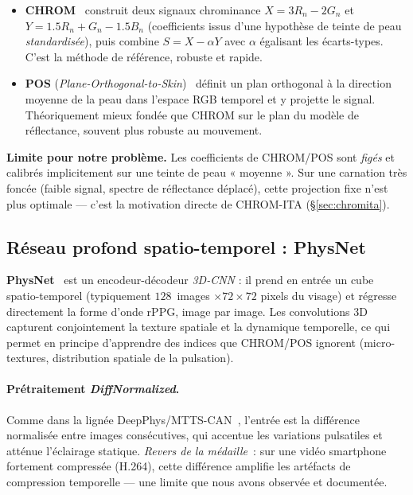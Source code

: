 \documentclass[11pt,a4paper]{article}
\begin{document}
\begin{itemize}[leftmargin=1.4em]
\item \textbf{CHROM}~\cite{dehaan2013} construit deux signaux chrominance
$X = 3R_n - 2G_n$ et $Y = 1.5R_n + G_n - 1.5B_n$ (coefficients issus d'une
hypothèse de teinte de peau \emph{standardisée}), puis combine
$S = X - \alpha Y$ avec $\alpha$ égalisant les écarts-types. C'est la méthode de
référence, robuste et rapide.
\item \textbf{POS} (\emph{Plane-Orthogonal-to-Skin})~\cite{wang2017} définit un
plan orthogonal à la direction moyenne de la peau dans l'espace RGB temporel et y
projette le signal. Théoriquement mieux fondée que CHROM sur le plan du modèle de
réflectance, souvent plus robuste au mouvement.
\end{itemize}

\noindent\textbf{Limite pour notre problème.} Les coefficients de CHROM/POS sont
\emph{figés} et calibrés implicitement sur une teinte de peau « moyenne ». Sur une
carnation très foncée (faible signal, spectre de réflectance déplacé), cette
projection fixe n'est plus optimale --- c'est la motivation directe de
CHROM-ITA (§\ref{sec:chromita}).

\subsection{Réseau profond spatio-temporel : PhysNet}

\textbf{PhysNet}~\cite{yu2019} est un encodeur-décodeur \emph{3D-CNN} : il prend
en entrée un cube spatio-temporel (typiquement $128$~images $\times 72\times72$
pixels du visage) et régresse directement la forme d'onde rPPG, image par image.
Les convolutions 3D capturent conjointement la texture spatiale et la dynamique
temporelle, ce qui permet en principe d'apprendre des indices que CHROM/POS
ignorent (micro-textures, distribution spatiale de la pulsation).

\paragraph{Prétraitement \emph{DiffNormalized}.} Comme dans la lignée
DeepPhys/MTTS-CAN~\cite{chen2018,liu2020}, l'entrée est la différence normalisée
entre images consécutives, qui accentue les variations pulsatiles et atténue
l'éclairage statique. \emph{Revers de la médaille}~: sur une vidéo smartphone
fortement compressée (H.264), cette différence amplifie les artéfacts de
compression temporelle --- une limite que nous avons observée et documentée.
\end{document}
